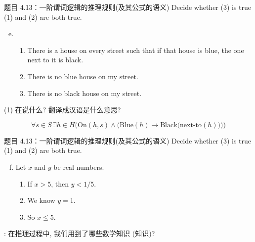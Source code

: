 \begin{frame}{}
  \begin{exampleblock}{题目 4.13：一阶谓词逻辑的推理规则(及其公式的语义)}
    Decide whether (3) is true  (1) and (2) are both true.

    \begin{enumerate}[(a)]
      \setcounter{enumi}{4}
      \item 
	\begin{enumerate}[(1)]
	  \item There is a house on every street such that if that house is blue,
	    the one next to it is black.
	  \item There is no blue house on my street.
	  \item There is no black house on my street.
	\end{enumerate}
    \end{enumerate}
  \end{exampleblock}

  \vspace{0.30cm}
  \centerline{(1) 在说什么? 翻译成汉语是什么意思?}

  \pause

  \pause
  \[
    \forall s\in S\, \exists h \in H 
    \Big(\text{On}(h,s) \land \big(\text{Blue}(h) \to \text{Black}\big(\text{next-to}(h)\big) \big)\Big)
  \]
\end{frame}

\begin{frame}{}
  \begin{exampleblock}{题目 4.13：一阶谓词逻辑的推理规则(及其公式的语义)}
    Decide whether (3) is true  (1) and (2) are both true.

    \begin{enumerate}[(a)]
      \setcounter{enumi}{5}
      \item Let $x$ and $y$ be real numbers.
	\begin{enumerate}[(1)]
	  \item If $x > 5$, then $y < 1/5$.
	  \item We know $y = 1$.
	  \item So $x \le 5$.
	\end{enumerate}
    \end{enumerate}
  \end{exampleblock}

  \pause
  \vspace{0.80cm}
  \centerline{: 在推理过程中, 我们用到了哪些数学知识 (知识)?}
\end{frame}

